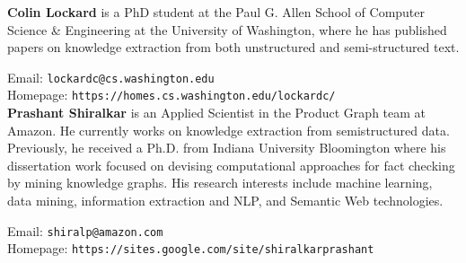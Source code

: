 {{\bfseries Colin Lockard} is a PhD student at the Paul G.
Allen School of Computer Science \& Engineering
at the University of Washington, where he has published papers on knowledge extraction from both
unstructured and semi-structured text.

Email: {\tt lockardc@cs.washington.edu}\\
Homepage: {\tt https://homes.cs.washington.edu/lockardc/} \\

{\bfseries Prashant Shiralkar} is an Applied Scientist in
the Product Graph team at Amazon. He currently works on knowledge extraction from semistructured data. Previously, he received a Ph.D.
from Indiana University Bloomington where his
dissertation work focused on devising computational approaches for fact checking by mining
knowledge graphs. His research interests include
machine learning, data mining, information extraction and NLP, and Semantic Web technologies.

Email: {\tt shiralp@amazon.com} \\
Homepage: {\tt https://sites.google.com/site/shiralkarprashant}

}
  
